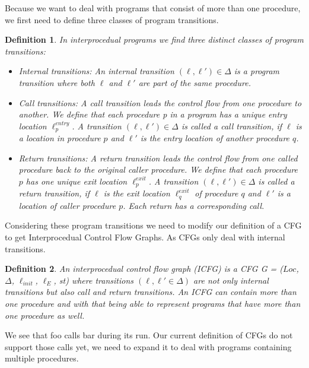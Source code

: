 \documentclass{article}
\newtheorem{mydef}{Definition}
\newcommand\mycom[1]{}
\newcommand\mycom[1]{#1}
\newcommand{\jw}[1]{\mycom{\todo[color=blue!40,inline]{\small JW: #1}}}
\newcommand{\jwl}[1]{\mycom{\todo[color=blue!40,inline,caption={Beschreibung},nolist]{\small #1}}}
\begin{document}
	\bigskip\bigskip\bigskip\noindent
	Because we want to deal with programs that consist of more than one procedure, we first need to define three classes of program transitions.
	

	
	\begin{mydef} In interprocedual programs we find three distinct classes of program transitions:
		\begin{itemize}
			\item Internal transitions: An internal transition $(\ell, \ell') \in \Delta$ is a program transition where both $\ell$ and $\ell'$ are part of the same procedure. 
			
			\item Call transitions:  A call transition leads the control flow from one procedure to another. We define that each procedure p in a program has a unique entry location $\ell^{entry}_p$. A transition $(\ell, \ell') \in \Delta$ is called a call transition, if $\ell$ is a location in procedure $p$ and $\ell'$ is the entry location of another procedure $q$.
			
			\item Return transitions: A return transition leads the control flow from one called procedure back to the original caller procedure. We define that each procedure $p$ has one unique exit location $\ell^{exit}_p$. A transition $(\ell, \ell') \in \Delta$ is called a return transition, if $\ell$ is the exit location $\ell_q^{exit}$ of procedure $q$ and $\ell'$ is a location of caller procedure $p$. Each return has a corresponding call.
		\end{itemize}
	\end{mydef}
\jw{explain the formulas}
	 \bigskip\noindent
	Considering these program transitions we need to modify our definition of a CFG to get Interprocedual Control Flow Graphs. As CFGs only deal with internal transitions.
	\begin{mydef}
		An interprocedual control flow graph (ICFG) is a CFG G = ($Loc$, $\Delta$, $\ell_{init}$, $\ell_E$, st) where transitions $(\ell, \ell' \in \Delta)$ are not only internal transitions but also call and return transitions. An ICFG can contain more than one procedure and with that being able to represent programs that have more than one procedure as well.
	\end{mydef}
	
	\jwl{Extend TF definition with predProc and succProc}
	\jw{\textbf{@ToDo extend example by procedure call}} 
	We see that foo calls bar during its run. Our current definition of CFGs do not support those calls yet, we need to expand it to deal with programs containing multiple procedures.
	
\end{document}
